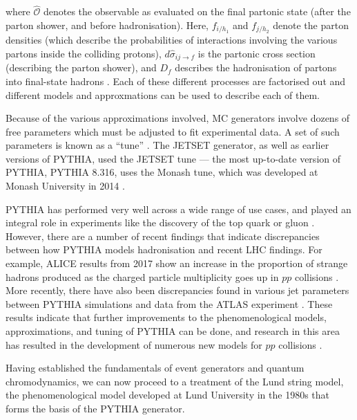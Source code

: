 \documentclass[12pt,a4paper]{report}
\begin{document}
where $\hat{\mathcal{O}}$ denotes the observable as evaluated on the final partonic state (after the parton shower, and before hadronisation). Here, $f_{i/h_1}$ and $f_{j/h_2}$ denote the parton densities (which describe the probabilities of interactions involving the various partons inside the colliding protons), $d\hat{\sigma}_{ij\rightarrow f}$ is the partonic cross section (describing the parton shower), and $D_f$ describes the hadronisation of partons into final-state hadrons \cite{Skands:2012ts}. Each of these different processes are factorised out and different models and approxmations can be used to describe each of them.

Because of the various approximations involved, MC generators involve dozens of free parameters which must be adjusted to fit experimental data. A set of such parameters is known as a ``tune'' \cite{Bierlich:2022pfr,Buckley:2011ms}. The JETSET generator, as well as earlier versions of PYTHIA, used the JETSET tune --- the most up-to-date version of PYTHIA, PYTHIA 8.316, uses the Monash tune, which was developed at Monash University in 2014 \cite{Bierlich:2022pfr,Skands:2014pea}.

PYTHIA has performed very well across a wide range of use cases, and played an integral role in experiments like the discovery of the top quark \cite{CDF:1995wbb, D0:1995jca} or gluon \cite{JADE:1979rke}. However, there are a number of recent findings that indicate discrepancies between how PYTHIA models hadronisation and recent LHC findings. For example, ALICE results from 2017 show an increase in the proportion of strange hadrons produced as the charged particle multiplicity goes up in $pp$ collisions \cite{ALICE:2016fzo}. More recently, there have also been discrepancies found in various jet parameters between PYTHIA simulations and data from the ATLAS experiment \cite{ATLAS:2024png}. These results indicate that further improvements to the phenomenological models, approximations, and tuning of PYTHIA can be done, and research in this area has resulted in the development of numerous new models for $pp$ collisions \cite{Altmann:2024odn,Bierlich:2014xba,Bergman}.

Having established the fundamentals of event generators and quantum chromodynamics, we can now proceed to a treatment of the Lund string model, the phenomenological model developed at Lund University in the 1980s that forms the basis of the PYTHIA generator.
\end{document}
